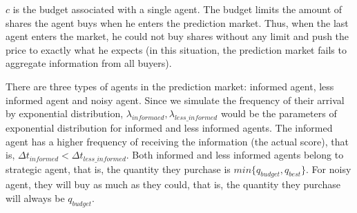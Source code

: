 \documentclass{article}
\begin{document}
$c$ is the budget associated with a single agent. The budget limits the amount of shares the agent buys when he enters the prediction market. Thus, when the last agent enters the market, he could not buy shares without any limit and push the price to exactly what he expects (in this situation, the prediction market fails to aggregate information from all buyers).

There are three types of agents in the prediction market: informed agent, less informed agent and noisy agent. Since we simulate the frequency of their arrival by exponential distribution, $\lambda_{informaed}, \lambda_{less\_ informed}$ would be the parameters of exponential distribution for informed and less informed agents. The informed agent has a higher frequency of receiving the information (the actual score),  that is, $\Delta t_{informed}<\Delta t_{less\_informed}$. Both informed and less informed agents belong to strategic agent, that is, the quantity they purchase is $min\{q_{budget}, q_{best}\}$. For noisy agent, they will buy as much as they could, that is, the quantity they purchase will always be $q_{budget}$.
\end{document}
